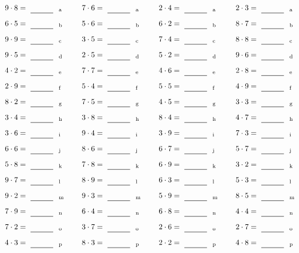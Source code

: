 \documentclass
[
  draft    = true,
  fontsize = 11pt,
  parskip  = half-
]
{scrartcl}
\begin{document}
\par\vfill\par
\begin{align*}
    \pline{9\cdot8}&=\rline{a}
  & \pline{7\cdot6}&=\rline{a}
  & \pline{2\cdot4}&=\rline{a}
  & \pline{2\cdot3}&=\rline{a} \\[1ex]
    \pline{6\cdot5}&=\rline{b}
  & \pline{5\cdot6}&=\rline{b}
  & \pline{6\cdot2}&=\rline{b}
  & \pline{8\cdot7}&=\rline{b} \\[1ex]
    \pline{9\cdot9}&=\rline{c}
  & \pline{3\cdot5}&=\rline{c}
  & \pline{7\cdot4}&=\rline{c}
  & \pline{8\cdot8}&=\rline{c} \\[1ex]
    \pline{9\cdot5}&=\rline{d}
  & \pline{2\cdot5}&=\rline{d}
  & \pline{5\cdot2}&=\rline{d}
  & \pline{9\cdot6}&=\rline{d} \\[1ex]
    \pline{4\cdot2}&=\rline{e}
  & \pline{7\cdot7}&=\rline{e}
  & \pline{4\cdot6}&=\rline{e}
  & \pline{2\cdot8}&=\rline{e} \\[1ex]
    \pline{2\cdot9}&=\rline{f}
  & \pline{5\cdot4}&=\rline{f}
  & \pline{5\cdot5}&=\rline{f}
  & \pline{4\cdot9}&=\rline{f} \\[1ex]
    \pline{8\cdot2}&=\rline{g}
  & \pline{7\cdot5}&=\rline{g}
  & \pline{4\cdot5}&=\rline{g}
  & \pline{3\cdot3}&=\rline{g} \\[1ex]
    \pline{3\cdot4}&=\rline{h}
  & \pline{3\cdot8}&=\rline{h}
  & \pline{8\cdot4}&=\rline{h}
  & \pline{4\cdot7}&=\rline{h} \\[1ex]
    \pline{3\cdot6}&=\rline{i}
  & \pline{9\cdot4}&=\rline{i}
  & \pline{3\cdot9}&=\rline{i}
  & \pline{7\cdot3}&=\rline{i} \\[1ex]
    \pline{6\cdot6}&=\rline{j}
  & \pline{8\cdot6}&=\rline{j}
  & \pline{6\cdot7}&=\rline{j}
  & \pline{5\cdot7}&=\rline{j} \\[1ex]
    \pline{5\cdot8}&=\rline{k}
  & \pline{7\cdot8}&=\rline{k}
  & \pline{6\cdot9}&=\rline{k}
  & \pline{3\cdot2}&=\rline{k} \\[1ex]
    \pline{9\cdot7}&=\rline{l}
  & \pline{8\cdot9}&=\rline{l}
  & \pline{6\cdot3}&=\rline{l}
  & \pline{5\cdot3}&=\rline{l} \\[1ex]
    \pline{9\cdot2}&=\rline{m}
  & \pline{9\cdot3}&=\rline{m}
  & \pline{5\cdot9}&=\rline{m}
  & \pline{8\cdot5}&=\rline{m} \\[1ex]
    \pline{7\cdot9}&=\rline{n}
  & \pline{6\cdot4}&=\rline{n}
  & \pline{6\cdot8}&=\rline{n}
  & \pline{4\cdot4}&=\rline{n} \\[1ex]
    \pline{7\cdot2}&=\rline{o}
  & \pline{3\cdot7}&=\rline{o}
  & \pline{2\cdot6}&=\rline{o}
  & \pline{2\cdot7}&=\rline{o} \\[1ex]
    \pline{4\cdot3}&=\rline{p}
  & \pline{8\cdot3}&=\rline{p}
  & \pline{2\cdot2}&=\rline{p}
  & \pline{4\cdot8}&=\rline{p}
\end{align*}
\end{document}
